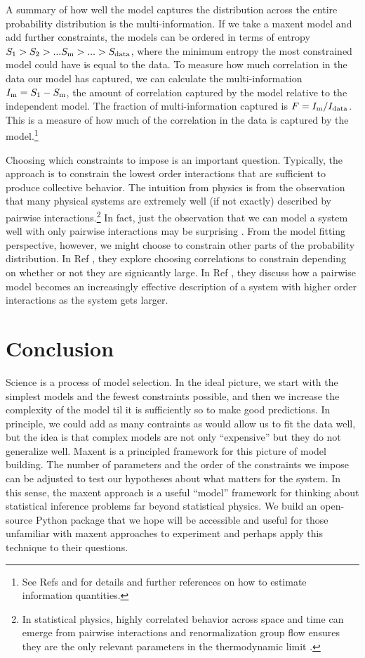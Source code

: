 \documentclass[aps,prl,twocolumn,nofootinbib]{revtex4-1}
\begin{document}
A summary of how well the model captures the distribution across the entire probability distribution is the multi-information. If we take a maxent model and add further constraints, the models can be ordered in terms of entropy $S_{\rm 1}>S_{2}>...S_{\rm m}>...>S_{\rm data}$, where the minimum entropy the most constrained model could have is equal to the data. To measure how much correlation in the data our model has captured, we can calculate the multi-information $I_{\rm m} = S_{\rm 1}-S_{\rm m}$, the amount of correlation captured by the model relative to the independent model. The fraction of multi-information captured is $F=I_{\rm m}/I_{\rm data}$. This is a measure of how much of the correlation in the data is captured by the model.\footnote{See Refs \cite{Bialek:2012ueb} and \cite{Lee:2015ev} for details and further references on how to estimate information quantities.}

Choosing which constraints to impose is an important question. Typically, the approach is to constrain the lowest order interactions that are sufficient to produce collective behavior. The intuition from physics is from the observation that many physical systems are extremely well (if not exactly) described by pairwise interactions.\footnote{In statistical physics, highly correlated behavior across space and time can emerge from pairwise interactions and renormalization group flow ensures they are the only relevant parameters in the thermodynamic limit \cite{}.} In fact, just the observation that we can model a system well with only pairwise interactions may be surprising \cite{Ranganathan:2007wz}. From the model fitting perspective, however, we might choose to constrain other parts of the probability distribution. In Ref \cite{Ganmor:2011ct}, they explore choosing correlations to constrain depending on whether or not they are signicantly large. In Ref \cite{Nemenman:2016kl}, they discuss how a pairwise model becomes an increasingly effective description of a system with higher order interactions as the system gets larger.



\section{Conclusion}
Science is a process of model selection. In the ideal picture, we start with the simplest models and the fewest constraints possible, and then we increase the complexity of the model til it is sufficiently so to make good predictions. In principle, we could add as many contraints as would allow us to fit the data well, but the idea is that complex models are not only ``expensive'' but they do not generalize well.
Maxent is a principled framework for this picture of model building. The number of parameters and the order of the constraints we impose can be adjusted to test our hypotheses about what matters for the system.
In this sense, the maxent approach is a useful ``model'' framework for thinking about statistical inference problems far beyond statistical physics. We build an open-source Python package that we hope will be accessible and useful for those unfamiliar with maxent approaches to experiment and perhaps apply this technique to their questions.
\end{document}
